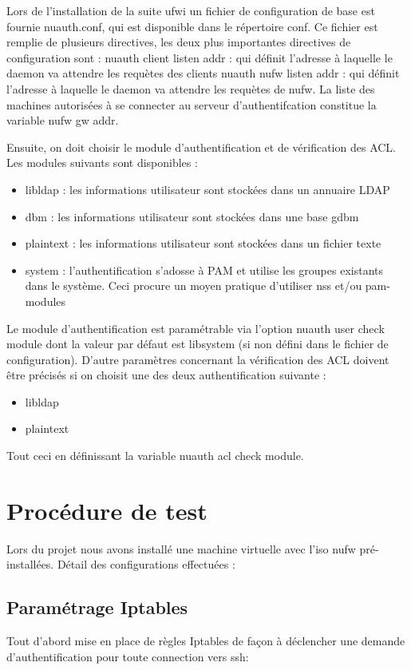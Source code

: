 \documentclass[12pt]{report}
\begin{document}
\begin{itemize}
Lors de l'installation de la suite ufwi un fichier de configuration de base est fournie nuauth.conf, qui est disponible 
dans le répertoire conf.
Ce fichier est remplie de plusieurs directives, les deux plus importantes directives de configuration sont : 
nuauth client listen addr : qui définit l’adresse à laquelle le daemon va attendre les requètes des clients 
nuauth nufw listen addr : qui définit l’adresse à laquelle le daemon va attendre les requètes de nufw. 
La liste des machines autorisées à se connecter au serveur d'authentifcation constitue la variable nufw gw addr.

Ensuite, on doit choisir le module d’authentification et de vérification des ACL. Les modules suivants sont disponibles :
\begin{itemize}
 \item libldap : les informations utilisateur sont stockées dans un annuaire LDAP
 \item dbm : les informations utilisateur sont stockées dans une base gdbm
 \item plaintext : les informations utilisateur sont stockées dans un fichier texte
 \item system : l’authentification s’adosse à PAM et utilise les groupes existants dans le système. Ceci procure un 
moyen pratique d’utiliser nss et/ou pam-modules
\end{itemize}

Le module d’authentification est paramétrable via l’option nuauth user check module dont la valeur par défaut est
libsystem (si non défini dans le fichier de configuration). D’autre paramètres concernant la vérification
des ACL doivent être précisés si on choisit une des deux authentification suivante :
\begin{itemize}
 \item libldap
 \item plaintext
\end{itemize}
Tout ceci en définissant la variable nuauth acl check module.

 \section{Procédure de test}
Lors du projet nous avons installé une machine virtuelle avec l'iso nufw pré-installées.
Détail des configurations effectuées :
\subsection{Paramétrage Iptables}
Tout d'abord mise en place de règles Iptables de façon à déclencher une 
demande d’authentification pour toute connection vers ssh:


\end{itemize}
\end{document}
